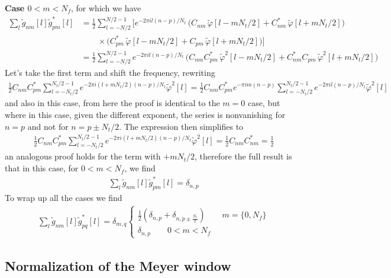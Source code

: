 \documentclass[twocolumn,preprintnumbers,
  superscriptaddress,
  nofootinbib,
  amsmath,
  amssymb,
  aps,
  prd,
  colorlinks=true,
  linkcolor=blue,
  urlcolor=blue,
  citecolor=blue,
  anchorcolor=blue
]{revtex4-2}
\begin{document}
\textbf{Case $0<m<N_f$}, for which we have
%
\begin{align}
\sum_{l}\tilde{g}_{nm}[l]\tilde{g}_{pm}^*[l]&=\frac{1}{2}\sum_{l=-N/2}^{N/2-1} \Bigg[e^{-2\pi i l (n-p)/N_t}\,\Big(C_{nm}\,\tilde{\varphi}[l - mN_t/2] + C_{nm}^*\,\tilde{\varphi}[l + mN_t/2]\Big) \\ 
& \qquad \times \Big(C_{pm}^*\,\tilde{\varphi}[l - mN_t/2] + C_{pm}\,\tilde{\varphi}[l + mN_t/2]\Big) \Bigg]\nonumber\\
&=\frac{1}{2}\sum_{l=-N/2}^{N/2-1} e^{-2\pi i l (n-p)/N_t}\,\Big(C_{nm}C^*_{pm}\,\tilde{\varphi}^2[l - mN_t/2] + C_{nm}^*C_{pm}\,\tilde{\varphi}^2[l + mN_t/2]\Big)
\end{align}
%
Let's take the first term and shift the frequency, rewriting
%
\begin{align}
\frac{1}{2}C_{nm}C^*_{pm}\sum_{l=-N_t/2}^{N_t/2-1} e^{-2\pi i (l+mN_t/2) (n-p)/N_t}\tilde{\varphi}^2[l]=\frac{1}{2}C_{nm}C^*_{pm}e^{-\pi i m(n-p)}\sum_{l=-N_t/2}^{N_t/2-1} e^{-2\pi i l(n-p)/N_t}\tilde{\varphi}^2[l]
\end{align}
%
and also in this case, from here the proof is identical to the $m=0$ case, but where in this case, given the different exponent, the series is nonvanishing for $n=p$ and not for $n=p\pm N_t/2$. The expression then simplifies to
%
\begin{align}
\frac{1}{2}C_{nm}C^*_{pm}\sum_{l=-N_t/2}^{N_t/2-1} e^{-2\pi i (l+mN_t/2) (n-p)/N_t}\tilde{\varphi}^2[l]=\frac{1}{2}C_{nm}C^*_{nm}=\frac{1}{2}
\end{align}
%
an analogous proof holds for the term with $+mN_t/2$, therefore the full result is that in this case, for $0<m<N_f$, we find
%
\begin{align}
\sum_{l}\tilde{g}_{nm}[l]\tilde{g}_{pm}^*[l]=\delta_{n,p}
\end{align}
%
To wrap up all the cases we find
%
\begin{align}
\sum_{l}\tilde{g}_{nm}[l]\tilde{g}_{pq}^*[l]=\delta_{m,q}\begin{cases}
    \frac{1}{2}\left(\delta_{n,p}+\delta_{n,p\pm \frac{N_t}{2}}\right) \qquad m=\{0,N_f\}\\
    \delta_{n,p} \qquad 0<m<N_f
\end{cases}
\end{align}




\subsection{Normalization of the Meyer window}\label{app:normalization_Meyer}
\end{document}
